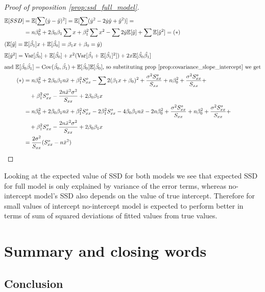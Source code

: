 \documentclass[12pt,a4paper,oneside]{book} %
\newcommand{\E}{\mathbb{E}}
\newcommand{\Var}{\mathrm{Var}}
\newcommand{\Cov}{\mathrm{Cov}}
\begin{document}
\begin{proof}[Proof of proposition \ref{prop:ssd_full_model}]
	\begin{align*}
		\E[SSD] &= \E[\sum (\dot{y}-\hat{y})^2] = \E [\sum (\dot{y}^2 - 2 \dot{y}\hat{y}+\hat{y}^2)]= \\
		&= n \beta_0^2 + 2 \beta_0 \beta_1 \sum x + \beta_1^2 \sum x^2 - \sum 2 \dot{y} \E [\hat{y}] + \sum \E [\hat{y}^2] = (\ast)\\
		\intertext{($\E [\hat{y}] = \E [\hat{\beta_1}]x + \E [\hat{\beta_0}] = \beta_1 x + \beta_0=\dot{y}$)}
		\intertext{$\E[\dot{y}^2]=\Var[\hat{\beta_0}]+\E[\hat{\beta_0}]+x^2(\Var [\hat{\beta_1}+\E [\hat{\beta_1}]^2])+2x\E[\hat{\beta_0}\hat{\beta_1}]$}
		\intertext{and $\E[\hat{\beta_0}\hat{\beta_1}]= \Cov (\hat{\beta_0},\hat{\beta_1})+\E[\hat{\beta_0}]\E[\hat{\beta_0}]$, so substituting prop \ref{prop:covariance_slope_intercept} we get}
		(\ast) &= n \beta_0^2+2\beta_0 \beta_1 n \bar{x} + \beta_1^2 S_{xx}^o - \sum 2(\beta_1x+\beta_0)^2+\frac{\sigma^2 S_{xx}^o}{S_{xx}}+n\beta_0^2+ \frac{\sigma^2 S_{xx}^o}{S_{xx}} + \\
		& \quad +\beta_1^2 S_{xx}^o-\frac{2n\bar{x}^2\sigma^2}{S_{xx}}+2\beta_0\beta_1x \\
		&= n \beta_0^2+2\beta_0 \beta_1 n \bar{x} + \beta_1^2 S_{xx}^o -2\beta_1^2 S_{xx}^o-4\beta_0\beta_1n\bar{x} -2n\beta_0^2+\frac{\sigma^2 S_{xx}^o}{S_{xx}}+n\beta_0^2+ \frac{\sigma^2 S_{xx}^o}{S_{xx}} + \\
		& \quad +\beta_1^2 S_{xx}^o-\frac{2n\bar{x}^2\sigma^2}{S_{xx}}+2\beta_0\beta_1x \\
		&= \frac{2\sigma^2}{S_{xx}}(S_{xx}^o-n\bar{x}^2)
	\end{align*}
\end{proof}

Looking at the expected value of SSD for both models we see that expected SSD for full model is only explained by variance of the error terms, whereas no-intercept model's SSD also depends on the value of true intercept. Therefore for small values of intercept no-intercept model is expected to perform better in terms of sum of squared deviations of fitted values from true values.


\clearpage



		
	\chapter{Summary and closing words}
	
	\section{Conclusion}
	
\end{document}
